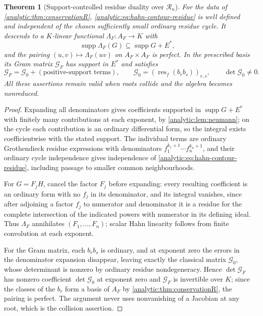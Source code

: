 \documentclass[11pt,letterpaper]{article}
\newtheorem{theorem}{Theorem}[section]
\theoremstyle{definition}
\theoremstyle{remark}
\newcommand{\RR}{\mathscr R}
\newcommand{\res}{\operatorname{res}}
\newcommand{\supp}{\operatorname{supp}}
\numberwithin{equation}{section}
\begin{document}
\begin{theorem}[Support-controlled residue duality over $\RR_n$]
\label{analytic:thm:residueduality}
For the data of \cref{analytic:thm:conservationR},
\eqref{analytic:eq:hahn-contour-residue} is well defined and independent of
the chosen sufficiently small ordinary residue cycle. It descends to a
$K$-linear functional $\Lambda_F:A_F\to K$ with
\begin{equation}\label{analytic:eq:residuesupport}
 \supp\Lambda_F(G)\subseteq\supp G+E^* ,
\end{equation}
and the pairing $(u,v)\mapsto\Lambda_F(uv)$ on $A_F\times A_F$ is perfect.
In the prescribed basis its Gram matrix $\mathcal G_F$ has support in $E^*$
and satisfies
\[
 \mathcal G_F=\mathcal G_0+(\text{positive-support terms}),\qquad
 \mathcal G_0=(\res_f(b_rb_s))_{r,s},\qquad \det\mathcal G_0\ne0 .
\]
All these assertions remain valid when roots collide and the algebra becomes
nonreduced.
\end{theorem}
\begin{proof}
Expanding all denominators gives coefficients supported in
$\supp G+E^*$ with finitely many contributions at each exponent, by
\cref{analytic:lem:neumann}; on the cycle each contribution is an ordinary
differential form, so the integral exists coefficientwise with the stated
support. The individual terms are ordinary Grothendieck residue expressions
with denominators $f_1^{k_1+1}\cdots f_n^{k_n+1}$, and their ordinary cycle
independence gives independence of
\eqref{analytic:eq:hahn-contour-residue}, including passage to smaller
common neighbourhoods.

For $G=F_jH$, cancel the factor $F_j$ before expanding: every resulting
coefficient is an ordinary form with no $f_j$ in its denominator, and its
integral vanishes, since after adjoining a factor $f_j$ to numerator and
denominator it is a residue for the complete intersection of the indicated
powers with numerator in its defining ideal. Thus $\Lambda_F$ annihilates
$(F_1,\ldots,F_n)$; scalar Hahn linearity follows from finite convolution at
each exponent.

For the Gram matrix, each $b_rb_s$ is ordinary, and at exponent zero the
errors in the denominator expansion disappear, leaving exactly the classical
matrix $\mathcal G_0$, whose determinant is nonzero by ordinary residue
nondegeneracy. Hence $\det\mathcal G_F$ has nonzero coefficient
$\det\mathcal G_0$ at exponent zero and $\mathcal G_F$ is invertible over
$K$; since the classes of the $b_r$ form a basis of $A_F$ by
\cref{analytic:thm:conservationR}, the pairing is perfect. The argument
never uses nonvanishing of a Jacobian at any root, which is the collision
assertion.
\end{proof}
\end{document}

